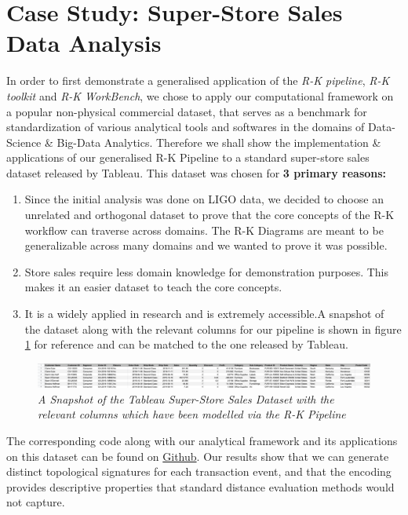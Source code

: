 \section{Case Study: Super-Store Sales Data Analysis}
\label{sec:store_sales_section}

In order to first demonstrate a generalised application of the \textit{R-K pipeline}, \textit{R-K toolkit} and \textit{R-K WorkBench}, we chose to apply our computational framework on a popular non-physical commercial dataset, that serves as a benchmark for standardization of various analytical tools and softwares in the domains of Data-Science \& Big-Data Analytics. Therefore we shall show the implementation \& applications of our generalised R-K Pipeline to a standard super-store sales dataset released by Tableau.\cite{TableauSuperStore} This dataset was chosen for \textbf{3 primary reasons:}

\begin{enumerate}
        \item{Since the initial analysis was done on LIGO data, we decided to choose an unrelated and orthogonal dataset to prove that the core concepts of the R-K workflow can traverse across domains. The R-K Diagrams are meant to be generalizable across many domains and we wanted to prove it was possible.}
        \item{Store sales require less domain knowledge for demonstration purposes. This makes it an easier dataset to teach the core concepts.}
        \item{It is a widely applied in research and is extremely accessible.A snapshot of the dataset along with the relevant columns for our pipeline is shown in figure \ref{fig:sample store sales dataset} for reference and can be matched to the one released by  Tableau.\cite{TableauSuperStore}}
\end{enumerate}

\begin{figure}[t]
	\centering
        \includegraphics[width=1\textwidth]{images/store_sales_dataset.png}
	\caption{\textit{A Snapshot of the Tableau Super-Store Sales Dataset with the relevant columns which have been modelled via the R-K Pipeline }}
	\label{fig:sample store sales dataset}
\end{figure}

The corresponding code along with our analytical framework and its applications on this dataset can be found on \href{https://github.com/animikhroy/rk_toolkit_pipeline_diagrams/tree/main/02_notebooks/rk_general_applications}{Github}. Our results show that we can generate distinct topological signatures for each transaction event, and that the encoding provides descriptive properties that standard distance evaluation methods would not capture.

